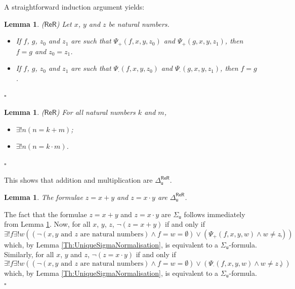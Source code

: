 \documentclass[11pt, a4paper]{article}
\newtheorem{lemma}[theorem]{Lemma}
\newenvironment{proof}[1][Proof]{\begin{trivlist}
\item[\hskip \labelsep {\bfseries #1}]}{\end{trivlist}}
\begin{document}
A straightforward induction argument yields:

\begin{lemma} \label{Th:UniquenessOfArithmeticAttempts}
($\mathsf{ReR}$) Let $x$, $y$ and $z$ be natural numbers. 
\begin{itemize}
\item[(I)] If $f$, $g$, $z_0$ and $z_1$ are such that $\Psi_+(f, x, y, z_0)$ and $\Psi_+(g, x, y, z_1)$, then $f=g$ and $z_0=z_1$.
\item[(II)] If $f$, $g$, $z_0$ and $z_1$ are such that $\Psi_{\cdot}(f, x, y, z_0)$ and $\Psi_{\cdot}(g, x, y, z_1)$, then $f=g$. 
\end{itemize}
\hfill$\square$
\end{lemma}

\begin{lemma} \label{Th:UniquenessOfArithmeticOperations}
($\mathsf{ReR}$) For all natural numbers $k$ and $m$,
\begin{itemize}
\item[(I)] $\exists! n (n= k+m)$;
\item[(II)] $\exists! n(n=k\cdot m)$.
\end{itemize}
\hfill$\square$
\end{lemma}

This shows that addition and multiplication are $\Delta_{\mathsf{u}}^{\mathsf{ReR}}$.

\begin{lemma} \label{Th:ComplexityOfArithmetic}
The formulae $z= x+y$ and $z=x\cdot y$ are $\Delta_{\mathsf{u}}^{\mathsf{ReR}}$.      
\end{lemma} 

\begin{proof}
The fact that the formulae $z=x+y$ and $z= x \cdot y$ are $\Sigma_{\mathsf{u}}$ follows immediately from Lemma \ref{Th:UniquenessOfArithmeticAttempts}. Now, for all $x$, $y$, $z$, $\neg(z= x+y)$ if and only if
\[
\exists! f \exists! w ((\neg (x, y \textrm{ and } z \textrm{ are natural numbers}) \land f=w=\emptyset)\lor (\Psi_+(f, x, y, w) \land w \neq z)),
\]
which, by Lemma \ref{Th:UniqueSigmaNormalisation}, is equivalent to a $\Sigma_{\mathsf{u}}$-formula. Similarly, for all $x$, $y$ and $z$, $\neg(z=x\cdot y)$ if and only if
\[
\exists! f \exists! w ((\neg (x, y \textrm{ and } z \textrm{ are natural numbers}) \land f=w=\emptyset)\lor (\Psi_\cdot(f, x, y, w) \land w \neq z)),
\]
which, by Lemma \ref{Th:UniqueSigmaNormalisation}, is equivalent to a $\Sigma_{\mathsf{u}}$-formula. \hfill$\square$
\end{proof}
\end{document}
